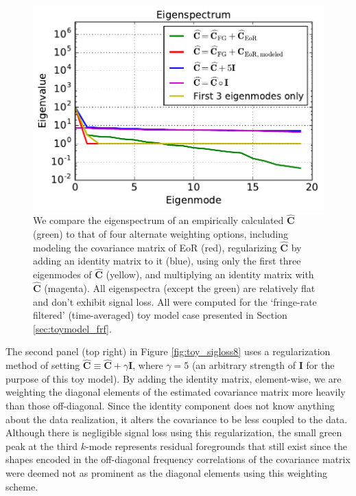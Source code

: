 \documentclass[preprint2,numberedappendix,tighten]{aastex6}
\begin{document}
\begin{figure}
	\centering
	\includegraphics[trim={0cm 0cm 0cm 0cm},clip,width=\columnwidth]{plots/toy_sigloss14.pdf}
	\caption{We compare the eigenspectrum of an empirically calculated $\widehat{\textbf{C}}$ (green) to that of four alternate 
weighting options, including modeling the covariance matrix of EoR (red), regularizing $\widehat{\textbf{C}}$ by adding an identity 
matrix to it (blue), using only the first three eigenmodes of $\widehat{\textbf{C}}$ (yellow), and multiplying an identity matrix with $
\widehat{\textbf{C}}$ (magenta). All eigenspectra (except the green) are relatively flat and don't exhibit signal loss. All were 
computed for the `fringe-rate filtered' (time-averaged) toy model case presented in Section \ref{sec:toymodel_frf}.}
	\label{fig:toy_sigloss14}
\end{figure}

The second panel (top right) in Figure \ref{fig:toy_sigloss8} uses a regularization method of setting $\widehat{\textbf{C}} \equiv 
\widehat{\textbf{C}} + \gamma\textbf{I}$, where $\gamma = 5$ (an arbitrary strength 
of $\textbf{I}$ for the purpose of this toy model). By adding the identity matrix, element-wise, we are weighting the diagonal 
elements of the estimated covariance matrix more heavily than those off-diagonal. Since the identity component does not know anything about the data realization, it alters the covariance to be less coupled to the data. Although there is negligible signal loss using this regularization, the small green peak at the third $k$-mode represents residual foregrounds that still exist since the shapes encoded in the off-diagonal frequency correlations of the covariance matrix were deemed not as prominent as the diagonal elements using this weighting scheme. 
\end{document}

